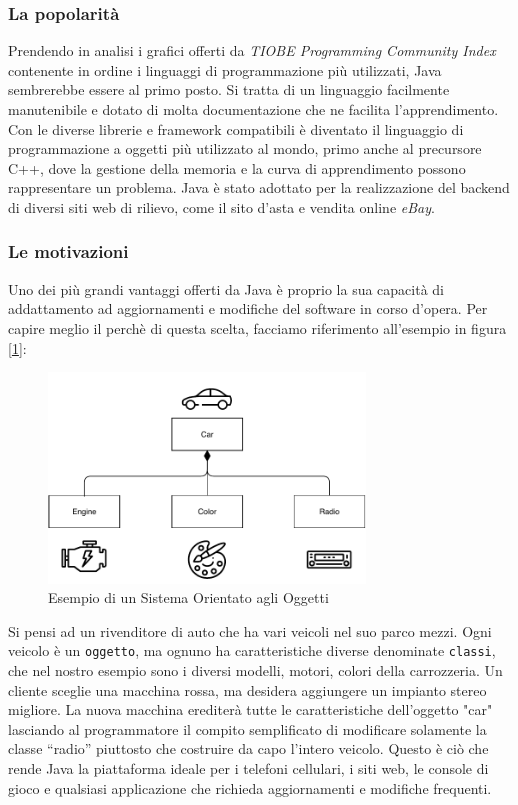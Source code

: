\subsubsection{La popolarità}
Prendendo in analisi i grafici offerti da \emph{TIOBE Programming Community Index} \cite{jansen:tiobe} contenente in ordine i linguaggi di programmazione più utilizzati, Java sembrerebbe essere al primo posto. Si tratta di un linguaggio facilmente manutenibile e dotato di molta documentazione che ne facilita l'apprendimento. Con le diverse librerie e framework compatibili è diventato il linguaggio di programmazione a oggetti più utilizzato al mondo, primo anche al precursore C++, dove la gestione della memoria e la curva di apprendimento possono rappresentare un problema. Java è stato adottato per la realizzazione del backend di diversi siti web di rilievo, come il sito d'asta e vendita online \textit{eBay}.

\subsubsection{Le motivazioni}
Uno dei più grandi vantaggi offerti da Java è proprio la sua capacità di addattamento ad aggiornamenti e modifiche del software in corso d'opera. Per capire meglio il perchè di questa scelta, facciamo riferimento all'esempio in figura [\ref{fig:objectoriented-system}]:
\begin{figure}[H]
    \centering
    \includegraphics[width=0.75\textwidth]{images/01_5_java_class_diagram.pdf}
    \caption{Esempio di un Sistema Orientato agli Oggetti}
    \label{fig:objectoriented-system}
\end{figure}
Si pensi ad un rivenditore di auto che ha vari veicoli nel suo parco mezzi. Ogni veicolo è un \texttt{oggetto}, ma ognuno ha caratteristiche diverse denominate \texttt{classi}, che nel nostro esempio sono i diversi modelli, motori, colori della carrozzeria. Un cliente sceglie una macchina rossa, ma desidera aggiungere un impianto stereo migliore. La nuova macchina erediterà tutte le caratteristiche dell'oggetto "car" lasciando al programmatore il compito semplificato di modificare solamente la classe “radio” piuttosto che costruire da capo l’intero veicolo. Questo è ciò che rende Java la piattaforma ideale per i telefoni cellulari, i siti web, le console di gioco e qualsiasi applicazione che richieda aggiornamenti e modifiche frequenti.

